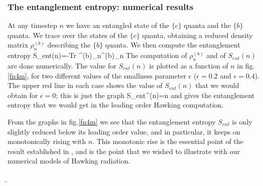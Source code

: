 \documentclass[11pt]{article}
\begin{document}
\subsubsection{The entanglement entropy: numerical results}

At any timestep $n$ we have an entangled state of the $\{c\}$ quanta and the $\{ b\} $ quanta. We trace over the states of the $\{ c\}$ quanta, obtaining a reduced density matrix $\rho^{(b)}_n$ describing the $\{ b \}$ quanta. We then compute the entanglement entropy
\be
S_{ent}(n)=-Tr \rho^{(b)}_n\ln \rho^{(b)}_n
\ee
The computation of $\rho^{(b)}_n$ and of $S_{ent}(n)$ are done numerically. The value for $S_{ent}(n)$ is plotted as a function of $n$ in fig.\ref{fn4m}, for two different values of the smallness parameter $\epsilon$ ($\epsilon=0.2$ and $\epsilon=0.4$).   The upper red line in each case shows the value of $S_{ent}(n)$ that we would obtain for $\epsilon=0$; this is just the graph
\be
S_{ent}^{}(n)=n
\ee
and gives the entanglement entropy that we would get in the leading order Hawking computation. 

From the graphs in fig.\ref{fn4m} we see that the entanglement entropy $S_{ent}$ is only slightly reduced below its leading order value, and in particular, it keeps on monotonically rising with $n$. This monotonic rise is the essential point of the  result established in \cite{mathurfuzz}, and is the point that we wished to illustrate with our numerical models of Hawking radiation.


\b
\end{document}
